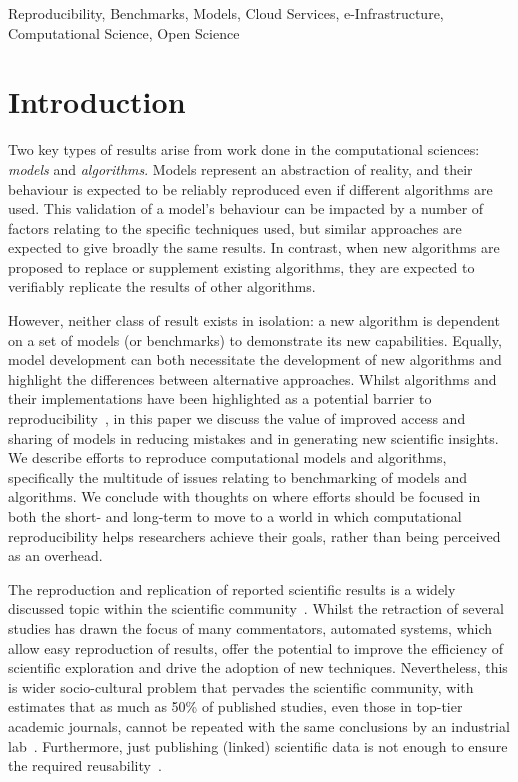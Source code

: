 \documentclass[conference]{IEEEtran}
\begin{document}
\begin{IEEEkeywords}
Reproducibility, Benchmarks, Models, Cloud Services, e-Infrastructure,
Computational Science, Open Science
\end{IEEEkeywords}

\IEEEpeerreviewmaketitle

\section{Introduction}

Two key types of results arise from work done in the computational
sciences: {\emph{models}} and {\emph{algorithms}}. Models represent an
abstraction of reality, and their behaviour is expected to be reliably
reproduced even if different algorithms are used. This validation of a
model's behaviour can be impacted by a number of factors relating to
the specific techniques used, but similar approaches are expected to
give broadly the same results.  In contrast, when new algorithms are
proposed to replace or supplement existing algorithms, they are
expected to verifiably replicate the results of other algorithms.

However, neither class of result exists in isolation: a new algorithm
is dependent on a set of models (or benchmarks) to demonstrate its new
capabilities. Equally, model development can both necessitate the
development of new algorithms and highlight the differences between
alternative approaches. Whilst algorithms and their implementations
have been highlighted as a potential barrier to
reproducibility~\cite{crick-et-al_wssspe2}, in this paper we discuss
the value of improved access and sharing of models in reducing
mistakes and in generating new scientific insights. We describe
efforts to reproduce computational models and algorithms, specifically
the multitude of issues relating to benchmarking of models and
algorithms.  We conclude with thoughts on where efforts should be
focused in both the short- and long-term to move to a world in which
computational reproducibility helps researchers achieve their goals,
rather than being perceived as an overhead.

The reproduction and replication of reported scientific results is a
widely discussed topic within the scientific
community~\cite{barnes:2010,morin-et-al:2012,joppa-et-al:2013}.
Whilst the retraction of several studies has drawn the focus of many
commentators, automated systems, which allow easy reproduction of
results, offer the potential to improve the efficiency of scientific
exploration and drive the adoption of new techniques. Nevertheless,
this is wider socio-cultural problem that pervades the scientific
community, with estimates that as much as 50\% of published studies,
even those in top-tier academic journals, cannot be repeated with the
same conclusions by an industrial
lab~\cite{osherovich:2011}. Furthermore, just publishing (linked)
scientific data is not enough to ensure the required
reusability~\cite{bechhofer-et-al:2013}.
\end{document}
